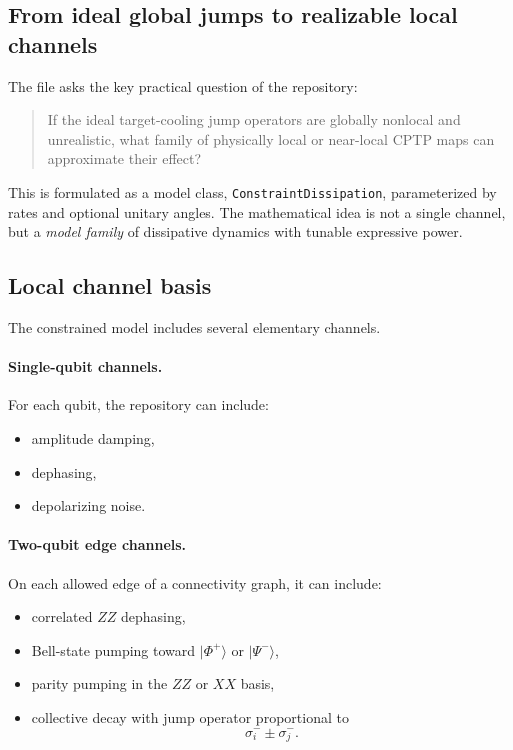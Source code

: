 \documentclass[11pt,a4paper]{article}
\begin{document}
\subsection{From ideal global jumps to realizable local channels}
The file  asks the key practical question of the repository:
\begin{quote}
If the ideal target-cooling jump operators are globally nonlocal and unrealistic, what family of physically local or near-local CPTP maps can approximate their effect?
\end{quote}

This is formulated as a model class, \texttt{ConstraintDissipation}, parameterized by rates and optional unitary angles. The mathematical idea is not a single channel, but a \emph{model family} of dissipative dynamics with tunable expressive power.

\subsection{Local channel basis}
The constrained model includes several elementary channels.

\paragraph{Single-qubit channels.}
For each qubit, the repository can include:
\begin{itemize}
  \item amplitude damping,
  \item dephasing,
  \item depolarizing noise.
\end{itemize}

\paragraph{Two-qubit edge channels.}
On each allowed edge of a connectivity graph, it can include:
\begin{itemize}
  \item correlated $ZZ$ dephasing,
  \item Bell-state pumping toward $\lvert \Phi^+\rangle$ or $\lvert \Psi^-\rangle$,
  \item parity pumping in the $ZZ$ or $XX$ basis,
  \item collective decay with jump operator proportional to
  \[
  \sigma^-_i \pm \sigma^-_j.
  \]
\end{itemize}
\end{document}

